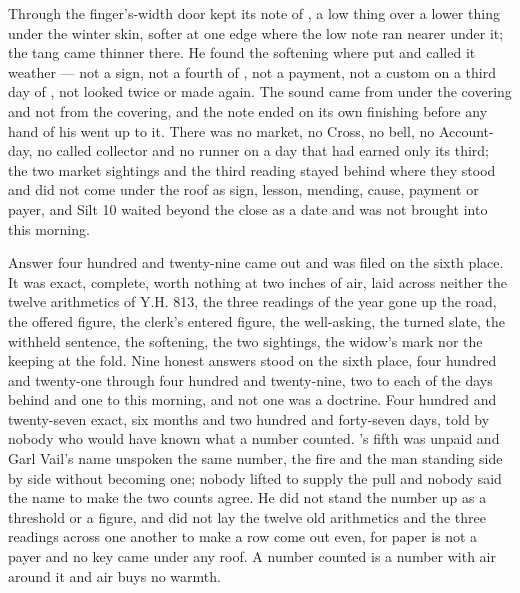 \scenebreak

Through the finger's-width door  kept its note of , a low thing over a lower thing under the winter skin, softer at one edge where the low note ran nearer under it; the tang came thinner there. He found the softening where put and called it weather --- not a sign, not a fourth of , not a payment, not a custom on a third day of , not looked twice or made again. The sound came from under the covering and not from the covering, and the note ended on its own finishing before any hand of his went up to it. There was no market, no Cross, no bell, no Account-day, no called collector and no runner on a day that had earned only its third; the two market sightings and the third reading stayed behind where they stood and did not come under the roof as sign, lesson, mending, cause, payment or payer, and Silt 10 waited beyond the close as a date and was not brought into this morning.

Answer four hundred and twenty-nine came out and was filed on the sixth place. It was exact, complete, worth nothing at two inches of air, laid across neither the twelve arithmetics of Y.H. 813, the three readings of the year gone up the road, the offered figure, the clerk's entered figure, the well-asking, the turned slate, the withheld sentence, the softening, the two sightings, the widow's mark nor the keeping at the fold. Nine honest answers stood on the sixth place, four hundred and twenty-one through four hundred and twenty-nine, two to each of the days behind and one to this morning, and not one was a doctrine. Four hundred and twenty-seven exact, six months and two hundred and forty-seven days, told by nobody who would have known what a number counted. 's fifth was unpaid and Garl Vail's name unspoken the same number, the fire and the man standing side by side without becoming one; nobody lifted  to supply the pull and nobody said the name to make the two counts agree. He did not stand the number up as a threshold or a figure, and did not lay the twelve old arithmetics and the three readings across one another to make a row come out even, for paper is not a payer and no key came under any roof. A number counted is a number with air around it and air buys no warmth.

